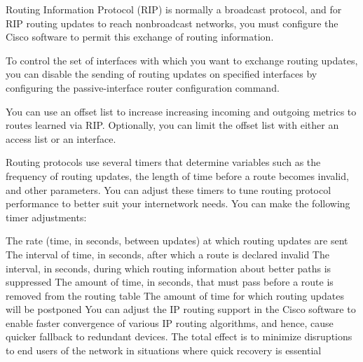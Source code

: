 \documentclass[../EngineeringJournal_CDavis.tex]{subfiles}
\begin{document}

\hspace{0.2cm}
\begin{tcolorbox}[width=6.3in]
\scriptsize
Routing Information Protocol (RIP) is normally a broadcast protocol, and for RIP routing updates to reach nonbroadcast networks, you must configure the Cisco software to permit this exchange of routing information.

To control the set of interfaces with which you want to exchange routing updates, you can disable the sending of routing updates on specified interfaces by configuring the passive-interface router configuration command.
\end{tcolorbox}
\hspace{0.2cm}
\normalsize  

\hspace{0.2cm}
\begin{tcolorbox}[width=6.3in]
\scriptsize
You can use an offset list to increase increasing incoming and outgoing metrics to routes learned via RIP. Optionally, you can limit the offset list with either an access list or an interface.

Routing protocols use several timers that determine variables such as the frequency of routing updates, the length of time before a route becomes invalid, and other parameters. You can adjust these timers to tune routing protocol performance to better suit your internetwork needs. You can make the following timer adjustments:
\end{tcolorbox}
\hspace{0.2cm}
\normalsize  

\hspace{0.2cm}
\begin{tcolorbox}[width=6.3in]
\scriptsize
The rate (time, in seconds, between updates) at which routing updates are sent
The interval of time, in seconds, after which a route is declared invalid
The interval, in seconds, during which routing information about better paths is suppressed
The amount of time, in seconds, that must pass before a route is removed from the routing table
The amount of time for which routing updates will be postponed
You can adjust the IP routing support in the Cisco software to enable faster convergence of various IP routing algorithms, and hence, cause quicker fallback to redundant devices. The total effect is to minimize disruptions to end users of the network in situations where quick recovery is essential
\end{tcolorbox}
\hspace{0.2cm}
\normalsize  
\end{document}
